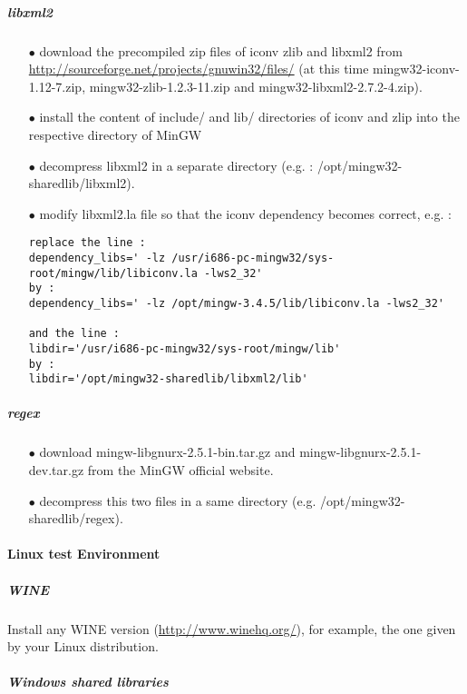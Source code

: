 \subparagraph{libxml2}

\begin{itemize}
\item[$\bullet$]  download the precompiled zip files of iconv zlib and libxml2 from \url{http://sourceforge.net/projects/gnuwin32/files/} (at this time mingw32-iconv-1.12-7.zip, mingw32-zlib-1.2.3-11.zip and mingw32-libxml2-2.7.2-4.zip).
\item[$\bullet$]  install the content of include/ and lib/ directories of iconv and zlip into the respective directory of MinGW
\item[$\bullet$]  decompress libxml2 in a separate directory (e.g. : /opt/mingw32-sharedlib/libxml2).
\item[$\bullet$]  modify libxml2.la file so that the iconv dependency becomes correct, e.g. :
\begin{verbatim}
replace the line :
dependency_libs=' -lz /usr/i686-pc-mingw32/sys-root/mingw/lib/libiconv.la -lws2_32'
by :
dependency_libs=' -lz /opt/mingw-3.4.5/lib/libiconv.la -lws2_32'

and the line :
libdir='/usr/i686-pc-mingw32/sys-root/mingw/lib'
by :
libdir='/opt/mingw32-sharedlib/libxml2/lib'
\end{verbatim}
\end{itemize}


\subparagraph{regex}

\begin{itemize}
\item[$\bullet$]  download mingw-libgnurx-2.5.1-bin.tar.gz and mingw-libgnurx-2.5.1-dev.tar.gz from the MinGW official website.

\item[$\bullet$]  decompress this two files in a same directory (e.g. /opt/mingw32-sharedlib/regex).
\end{itemize}



\paragraph{Linux test Environment}

\subparagraph{WINE}

Install any WINE version (\url{http://www.winehq.org/}), for example, the one given by your Linux distribution.


\subparagraph{Windows shared libraries}

